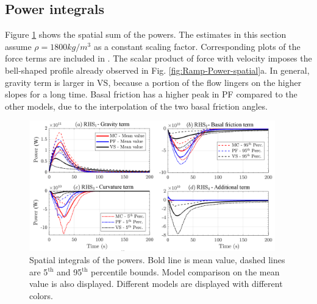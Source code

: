 \documentclass{article}
\begin{document}
\subsection{Power integrals}
Figure \ref{fig:Colima-Power-spatial} shows the spatial sum of the powers. The estimates in this section assume $\rho = 1800 kg/m^3$ as a constant scaling factor. Corresponding plots of the force terms are included in \cite{Patra2018}. The scalar product of force with velocity imposes the bell-shaped profile already observed in Fig. \ref{fig:Ramp-Power-spatial}a. In general, gravity term is larger in VS, because a portion of the flow lingers on the higher slopes for a long time. Basal friction has a higher peak in PF compared to the other models, due to the interpolation of the two basal friction angles.
\begin{figure}[H]
        \centering
        \includegraphics[width=0.95\textwidth]{figures/Colima/PowersColima.png}
        \caption{Spatial integrals of the powers. Bold line is mean value, dashed lines are 5$^{\mathrm{th}}$ and 95$^{\mathrm{th}}$ percentile bounds. Model comparison on the mean value is also displayed. Different models are displayed with different colors.}
        \label{fig:Colima-Power-spatial}
\end{figure}
\end{document}
